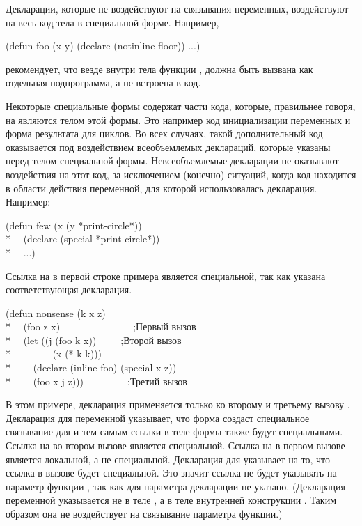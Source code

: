\begin{defspec}
Декларации, которые не воздействуют на связывания переменных, воздействуют на
весь код тела в специальной форме.
Например,
\begin{lisp}
(defun foo (x y) (declare (notinline floor)) ...)
\end{lisp}
рекомендует, что везде внутри тела функции ,  должна быть
вызвана как отдельная подпрограмма, а не встроена в код.

Некоторые специальные формы содержат части кода, которые, правильнее говоря, на
являются телом этой формы. Это например код инициализации переменных и форма
результата для циклов.
Во всех случаях, такой дополнительный код оказывается под воздействием
всеобъемлемых деклараций, которые указаны перед телом специальной формы.
Невсеобъемлемые декларации не оказывают воздействия на этот код, за исключением
(конечно) ситуаций, когда код находится в области действия переменной, для
которой использовалась декларация.
Например:
\begin{lisp}
(defun few (x  (y *print-circle*)) \\*
~~(declare (special *print-circle*)) \\*
~~...)
\end{lisp}
Ссылка на  в первой строке примера является специальной, так
как указана соответствующая декларация.
\begin{lisp}
(defun nonsense (k x z) \\*
~~(foo z x)~~~~~~~~~~~~~~~;\textrm{Первый вызов } \\*
~~(let ((j (foo k x))~~~~~;\textrm{Второй вызов } \\*
~~~~~~~~(x (* k k))) \\*
~~~~(declare (inline foo) (special x z)) \\*
~~~~(foo x j z)))~~~~~~~~~;\textrm{Третий вызов }
\end{lisp}
В этом примере, декларация  применяется только ко второму и третьему вызову
.
Декларация  для переменной  указывает, что форма 
создаст специальное связывание для  и тем самым ссылки в теле формы также
будут специальными.
Ссылка на  во втором вызове  является специальной.
Ссылка на  в первом вызове  является локальной, а не специальной.
Декларация  для  указывает на то, что ссылка в вызове
 будет специальной. Это значит ссылка не будет указывать на параметр
функции , так как для параметра декларации  не
указано.
(Декларация  переменной  указывается не в теле , а
в теле внутренней конструкции . Таким образом она не воздействует на
связывание параметра функции.)
\end{defspec}

